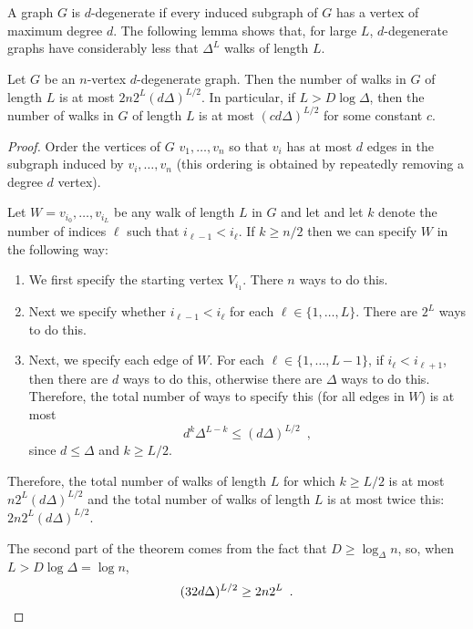 \documentclass[lotsofwhite]{patmorin}
\begin{document}
A graph $G$ is $d$-degenerate if every induced subgraph of $G$ has
a vertex of maximum degree $d$.  The following lemma shows that, for
large $L$, $d$-degenerate graphs have considerably less that $\Delta^L$
walks of length $L$.

\begin{lem}
   Let $G$ be an $n$-vertex $d$-degenerate graph. Then the number of
   walks in $G$ of length $L$ is at most $2n2^{L}(d\Delta)^{L/2}$.
   In particular, if $L > D\log\Delta$, then the number of walks in $G$
   of length $L$ is at most $(cd\Delta)^{L/2}$ for some constant $c$.
\end{lem}

\begin{proof}
   Order the vertices of $G$ $v_1,\ldots,v_n$ so that $v_i$ has at most
   $d$ edges in the subgraph induced by $v_i,\ldots,v_n$ (this ordering
   is obtained by repeatedly removing a degree $d$ vertex).

   Let $W=v_{i_0},\ldots,v_{i_L}$ be any walk of length $L$ in $G$ and
   let and let $k$ denote the number of indices $\ell$ such that $i_{\ell-1}
   < i_{\ell}$.  
   If $k\ge n/2$ then we can specify $W$ in the following way:
   \begin{enumerate}
     \item We first specify the starting vertex $V_{i_1}$.  There $n$
       ways to do this.
     \item Next we specify whether $i_{\ell-1} < i_{\ell}$ for each
       $\ell\in\{1,\ldots,L\}$.  There are $2^L$ ways to do this.
     \item Next, we specify each edge of $W$.  For each
       $\ell\in\{1,\ldots,L-1\}$, if $i_{\ell} < i_{\ell+1}$,
       then there are $d$ ways to do this, otherwise there are $\Delta$
       ways to do this.
      Therefore, the total number of ways to specify this (for all edges
      in $W$) is at most
      \[   d^k\Delta^{L-k} \le (d\Delta)^{L/2}  \enspace ,\]
      since $d\le \Delta$ and $k\ge L/2$.
   \end{enumerate}
   Therefore, the total number of walks of length $L$ for which $k\ge
   L/2$ is at most $n2^L(d\Delta)^{L/2}$ and the total number of walks
   of length $L$ is at most twice this: $2n2^L(d\Delta)^{L/2}$.

   The second part of the theorem comes from the fact that $D\ge \log_\Delta n$, so, when $L>D\log\Delta=\log n$,
   \[ (32d\Delta)^{L/2} \ge 2n2^L \enspace . \qedhere \]
\end{proof}
\end{document}
